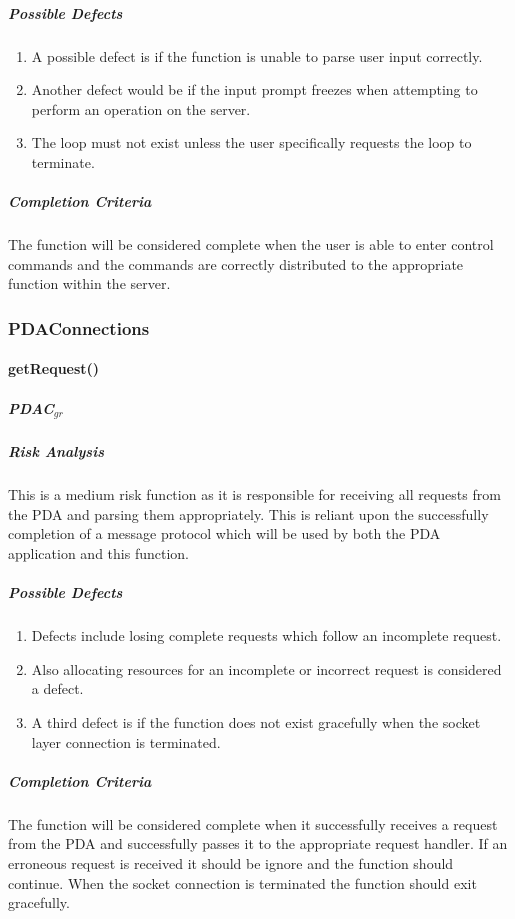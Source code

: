 \documentclass{article}
\begin{document}
\subparagraph{Possible Defects}
\begin{enumerate}
\item A possible defect is if the function is unable to parse user input correctly.
\item Another defect would be if the input prompt freezes when attempting to perform an operation on the server.
\item The loop must not exist unless the user specifically requests the loop to terminate.
\end{enumerate}

\subparagraph{Completion Criteria}
The function will be considered complete when the user is able to enter control commands and the commands are correctly distributed to the appropriate function within the server. 

\subsubsection{PDAConnections}
\paragraph{getRequest()}
\subparagraph{PDAC$_{gr}$}

\subparagraph{Risk Analysis}
This is a medium risk function as it is responsible for receiving all requests from the PDA and parsing them appropriately.  This is reliant upon the successfully completion of a message protocol which will be used by both the PDA application and this function.

\subparagraph{Possible Defects}
\begin{enumerate}
\item Defects include losing complete requests which follow an incomplete request.
\item Also allocating resources for an incomplete or incorrect request is considered a defect.
\item A third defect is if the function does not exist gracefully when the socket layer connection is terminated.
\end{enumerate}

\subparagraph{Completion Criteria}
The function will be considered complete when it successfully receives a request from the PDA and successfully passes it to the appropriate request handler. If an erroneous request is received it should be ignore and the function should continue.  When the socket connection is terminated the function should exit gracefully.
\end{document}
